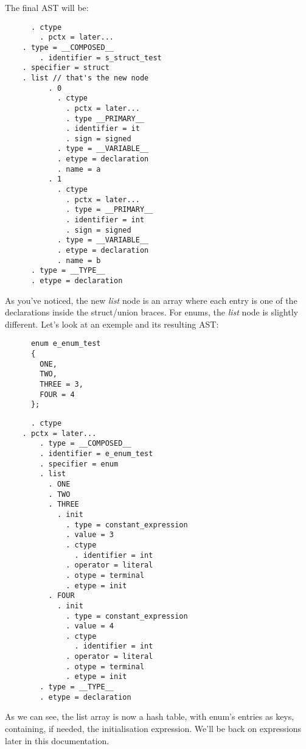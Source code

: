 \documentclass[a4paper,11pt]{report}
\begin{document}
    The final AST will be:
    \begin{lstlisting}
      . ctype
        . pctx = later...
	. type = __COMPOSED__
        . identifier = s_struct_test
	. specifier = struct
	. list // that's the new node
          . 0
            . ctype
              . pctx = later...
              . type __PRIMARY__
              . identifier = it
              . sign = signed
            . type = __VARIABLE__
            . etype = declaration
            . name = a
          . 1
            . ctype
              . pctx = later...
              . type = __PRIMARY__
              . identifier = int
              . sign = signed
            . type = __VARIABLE__
            . etype = declaration
            . name = b
      . type = __TYPE__
      . etype = declaration
    \end{lstlisting}

    As you've noticed, the new \textit{list} node is an array where each
    entry is one of the declarations inside the struct/union braces.
    For enums, the \textit{list} node is slightly different. Let's look
    at an exemple and its resulting AST:

    \begin{lstlisting}
      enum e_enum_test
      {
        ONE,
        TWO,
        THREE = 3,
        FOUR = 4
      };
    \end{lstlisting}

    \begin{lstlisting}
      . ctype
	. pctx = later...
        . type = __COMPOSED__
        . identifier = e_enum_test
        . specifier = enum
        . list
          . ONE
          . TWO
          . THREE
            . init
              . type = constant_expression
              . value = 3
              . ctype
                . identifier = int
              . operator = literal
              . otype = terminal
              . etype = init
          . FOUR
            . init
              . type = constant_expression
              . value = 4
              . ctype
                . identifier = int
              . operator = literal
              . otype = terminal
              . etype = init
        . type = __TYPE__
        . etype = declaration
    \end{lstlisting}
    
    As we can see, the list array is now a hash table, with enum's entries as
    keys, containing, if needed, the initialisation expression. We'll be back
    on expressions later in this documentation.
\end{document}
